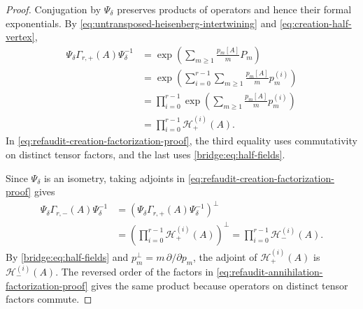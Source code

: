 \documentclass[12pt,reqno,a4paper]{amsart}
\numberwithin{equation}{section}
\numberwithin{figure}{section}
\theoremstyle{plain}
\theoremstyle{definition}
\begin{document}
\begin{proof}
Conjugation by $\Psi_\delta$ preserves products of operators and hence
their formal exponentials.  By
\eqref{eq:untransposed-heisenberg-intertwining} and
\eqref{eq:creation-half-vertex},
\begin{equation}\label{eq:refaudit-creation-factorization-proof}
\begin{aligned}
 \Psi_\delta\Gamma_{r,+}(A)\Psi_\delta^{-1}
 &=\exp\left(\sum_{m\geq1}\frac{p_m[A]}m P_m\right)\\
 &=\exp\left(\sum_{i=0}^{r-1}\sum_{m\geq1}
                  \frac{p_m[A]}m p_m^{(i)}\right)\\
 &=\prod_{i=0}^{r-1}\exp\left(
                  \sum_{m\geq1}\frac{p_m[A]}m p_m^{(i)}\right)\\
 &=\prod_{i=0}^{r-1}\mathcal H_+^{(i)}(A).
\end{aligned}
\end{equation}
In \eqref{eq:refaudit-creation-factorization-proof}, the third equality
uses commutativity on distinct tensor factors, and the last uses
\eqref{bridge:eq:half-fields}.

Since $\Psi_\delta$ is an isometry, taking adjoints in
\eqref{eq:refaudit-creation-factorization-proof} gives
\begin{equation}\label{eq:refaudit-annihilation-factorization-proof}
\begin{aligned}
 \Psi_\delta\Gamma_{r,-}(A)\Psi_\delta^{-1}
 &=\left(\Psi_\delta\Gamma_{r,+}(A)\Psi_\delta^{-1}\right)^\perp\\
 &=\left(\prod_{i=0}^{r-1}\mathcal H_+^{(i)}(A)\right)^\perp
 =\prod_{i=0}^{r-1}\mathcal H_-^{(i)}(A).
\end{aligned}
\end{equation}
By \eqref{bridge:eq:half-fields} and
$p_m^\perp=m\,\partial/\partial p_m$, the adjoint of
$\mathcal H_+^{(i)}(A)$ is $\mathcal H_-^{(i)}(A)$.
The reversed order of the factors in
\eqref{eq:refaudit-annihilation-factorization-proof} gives the same
product because operators on distinct tensor factors commute.
\end{proof}
\end{document}
